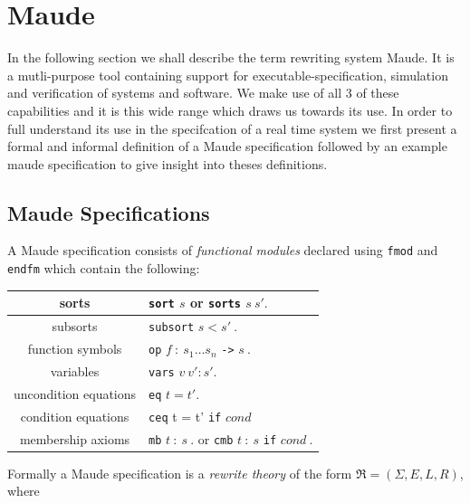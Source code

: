 \section{Maude}
In the following section we shall describe the term rewriting system Maude. It is a mutli-purpose tool containing support for executable-specification, simulation and verification of systems and software. We make use of all 3 of these capabilities and it is this wide range which draws us towards its use. In order to full understand its use in the specifcation of a real time system we first present a formal and informal definition of a Maude specification followed by an example maude specification to give insight into theses definitions.



\subsection{Maude Specifications}

A Maude specification consists of \emph{functional modules} declared using \texttt{fmod} and \texttt{endfm} which contain the following:

\medskip
\begin{center}
\begin{tabular}{| c | l |}
\hline
sorts    & \texttt{sort} $s$ or \texttt{sorts}  $s \ s' .$ \\ \hline
subsorts  & \texttt{subsort} $s < s' \ .$ \\ \hline
function symbols  & \texttt{op} $f \ :  \ s_1 \ldots s_n$ \texttt{->} $s \ .$ \\ \hline
variables  & \texttt{vars} $v \ v' : s' .$\\ \hline
uncondition equations  &\texttt{eq} $t = t' .$\\ \hline
condition equations & \texttt{ceq} t = t' \texttt{if} $cond$ \\ \hline
membership axioms & \texttt{mb} $t \ : \ s \ .$ or \texttt{cmb} $t  \ : \ s$ \texttt{if} $cond \ .$  \\ \hline
\end{tabular}
\end{center}


Formally a Maude specification is a \emph{rewrite theory} of the form $\mathfrak{R}=(\Sigma,E,L,R)$, where 

